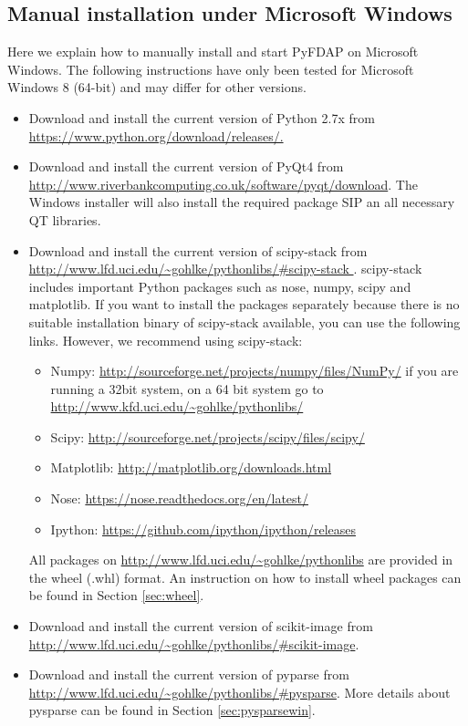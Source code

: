 \documentclass[a4paper,11pt]{article}
\begin{document}
\subsection{Manual installation under Microsoft Windows}

Here we explain how to  manually  install and start PyFDAP on Microsoft Windows. The following instructions have only been tested for Microsoft Windows 8 (64-bit) and may differ for other versions.

\begin{itemize}
 \item Download and install the current version of Python 2.7x from \url{https://www.python.org/download/releases/.}
 \item Download and install the current version of PyQt4 from \url{http://www.riverbankcomputing.co.uk/software/pyqt/download}. The Windows installer will also install the required package SIP an
all necessary QT libraries.
 \item Download and install the current version of scipy-stack from \url{http://www.lfd.uci.edu/~gohlke/pythonlibs/#scipy-stack }. scipy-stack includes important Python packages such as nose, numpy, scipy
 and matplotlib. If you want to install the packages separately because there is no suitable installation binary of scipy-stack available, you can use the following links. However, we recommend using scipy-stack:
 \begin{itemize}
 \item Numpy: \url{http://sourceforge.net/projects/numpy/files/NumPy/} if you are running a 32bit system, on a 64 bit system go to \url{http://www.kfd.uci.edu/~gohlke/pythonlibs/}
 \item Scipy: \url{http://sourceforge.net/projects/scipy/files/scipy/}
 \item Matplotlib: \url{http://matplotlib.org/downloads.html}
 \item Nose: \url{https://nose.readthedocs.org/en/latest/}
 \item Ipython: \url{https://github.com/ipython/ipython/releases}
 \end{itemize}
 All packages on \url{http://www.lfd.uci.edu/~gohlke/pythonlibs} are provided in the wheel (.whl) format. An instruction on how to install wheel packages can be found in Section \ref{sec:wheel}.
\item  Download and install the current version of scikit-image from \url{http://www.lfd.uci.edu/~gohlke/pythonlibs/#scikit-image}.
\item  Download and install the current version of pyparse from \url{http://www.lfd.uci.edu/~gohlke/pythonlibs/#pysparse}. More details about pysparse can be found in Section \ref{sec:pysparsewin}.

\end{itemize}
\end{document}
